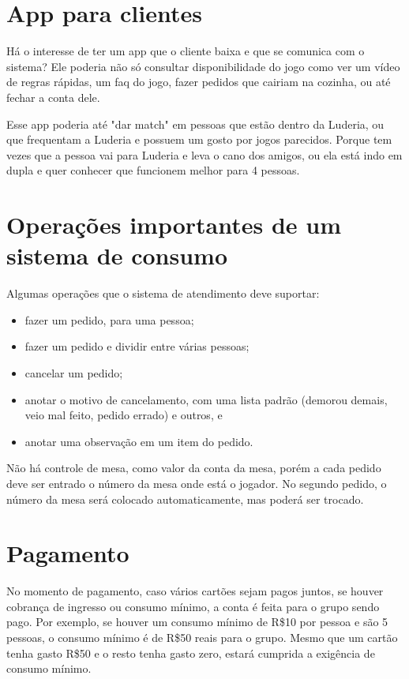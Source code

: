\section{App para clientes}

Há o interesse de ter um app que o cliente baixa e que se comunica com o sistema? Ele poderia não só consultar disponibilidade do jogo como ver um vídeo de regras rápidas, um faq do jogo, fazer pedidos que cairiam na cozinha, ou até fechar a conta dele. 

Esse app poderia até "dar match" em pessoas que estão dentro da Luderia, ou que frequentam a Luderia e possuem um gosto por jogos parecidos. Porque tem vezes que a pessoa vai para Luderia e leva o cano dos amigos, ou ela está indo em dupla e quer conhecer que funcionem melhor para 4 pessoas.

\section{Operações importantes de um sistema de consumo}

Algumas operações que o sistema de atendimento deve suportar:
\begin{itemize}
    \item fazer um pedido, para uma pessoa;
    \item fazer um pedido e dividir entre várias pessoas; 
    \item cancelar um pedido;
    \item anotar o motivo de cancelamento, com uma lista padrão (demorou demais, veio mal feito, pedido errado) e outros, e
    \item anotar uma observação em um item do pedido.
\end{itemize}

Não há controle de mesa, como valor da conta da mesa, porém a cada pedido deve ser entrado o número da mesa onde está o jogador. No segundo pedido, o número da mesa será colocado automaticamente, mas poderá ser trocado.

\section{Pagamento}

No momento de pagamento, caso vários cartões sejam pagos juntos, se houver cobrança de ingresso ou consumo mínimo, a conta é feita para o grupo sendo pago. Por exemplo, se houver um consumo mínimo de R\$10 por pessoa e são 5 pessoas, o consumo mínimo é de R\$50 reais para o grupo. Mesmo que um cartão tenha gasto R\$50 e o resto tenha gasto zero, estará cumprida a exigência de consumo mínimo. 

